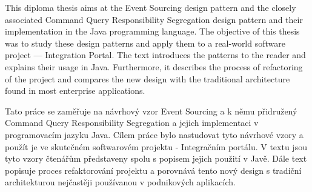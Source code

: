 \documentclass[11pt,twoside,a4paper]{book}
\begin{document}
 
	\abstractpage

	This diploma thesis aims at the Event Sourcing design pattern and the closely associated Command Query Responsibility Segregation design pattern and their implementation in the Java programming language. The objective of this thesis was to study these design patterns and apply them to a real-world software project --- Integration Portal. The text introduces the patterns to the reader and explains their usage in Java. Furthermore, it describes the process of refactoring of the project and compares the new design with the traditional architecture found in most enterprise applications.


	\baselineskip

	\noindent
	Tato práce se zaměřuje na návrhový vzor Event Sourcing a k němu přidružený Command Query Responsibility Segregation a jejich implementaci v programovacím jazyku Java. Cílem práce bylo nastudovat tyto návrhové vzory a použít je ve skutečném softwarovém projektu - Integračním portálu. V textu jsou tyto vzory čtenářům představeny spolu s popisem jejich použití v Javě. Dále text popisuje proces refaktorování projektu a porovnává tento nový design s tradiční architekturou nejčastěji používanou v podnikových aplikacích.

	\tableofcontents		%

	\listoffigures			%

	\mainbodystarts








%
%

\end{document}
